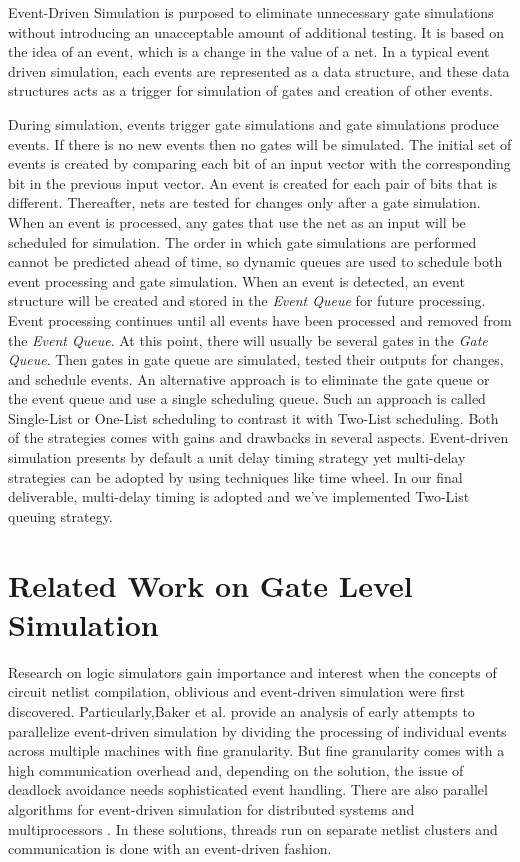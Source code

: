 \documentclass[a4paper,onesided,12pt]{report}
\begin{document}
 Event-Driven Simulation is purposed to eliminate unnecessary gate simulations
 without introducing an unacceptable amount of additional testing. It is based on the idea of an event, which is a change in the value of a net. In a typical event driven simulation, each events are represented as a data structure,
 and these data structures acts as a trigger for simulation of gates and  creation of other events.
 
 During simulation, events trigger gate simulations and gate simulations produce
 events. If there is no new events then no gates will be simulated. The initial set of events is created by comparing each bit of an input vector with the corresponding bit in the previous input vector. An event is created for each pair of bits that is different. Thereafter, nets are tested for changes only after a gate simulation. When an event is processed, any gates that use the net as an input will be scheduled for simulation. The order in which gate simulations are performed cannot be predicted ahead of time, so dynamic queues are used to schedule both event processing and gate simulation. When an event is detected, an event structure will be created and stored in the \emph{Event
 Queue} for future processing. Event processing continues until all events have been processed and removed from the \emph{Event Queue}. At this point, there will usually be several gates in the \emph{Gate Queue}. Then gates in gate queue are simulated, tested their outputs for changes, and schedule events. An alternative approach is to eliminate the gate queue or the event queue and use a single scheduling queue. Such an approach is called Single-List or One-List scheduling to contrast it with Two-List scheduling. Both of the strategies comes with gains and drawbacks in several aspects. Event-driven simulation presents by default a unit delay timing strategy yet multi-delay strategies can be adopted by using techniques like time wheel. In our final deliverable, multi-delay timing is adopted and we've implemented Two-List queuing strategy.
 
 
   
 
 \chapter{Related Work on Gate Level Simulation}
 \label{chapter:related-work}
 
Research on logic simulators gain importance and interest when the
concepts of circuit netlist compilation, oblivious and event-driven
simulation were first discovered. Particularly,Baker et al.\cite{baker} provide
an analysis of early attempts to parallelize event-driven
simulation by dividing the processing of individual events
across multiple machines with fine granularity. But fine granularity
comes with a high communication overhead and, depending
on the solution, the issue of deadlock avoidance needs sophisticated
event handling. There are also parallel algorithms for event-driven simulation
for distributed systems \cite{manjikian,matsumoto} and multiprocessors
\cite{kim}. In these solutions, threads run on separate netlist clusters and communication is done with an event-driven fashion.  
\end{document}
